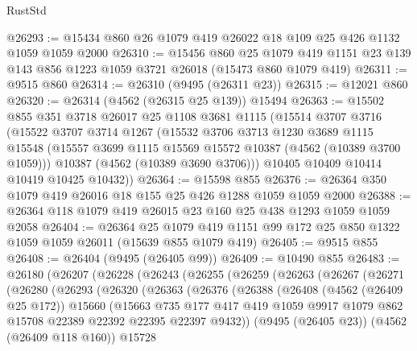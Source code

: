 \begin{lexlean}{RustStd}
\begin{coremodule}
@26293 := @15434 @860 @26 @1079 @419 @26022 @18 @109 @25 @426 @1132 @1059 @1059 @2000
@26310 := @15456
    @860
    @25
    @1079
    @419
    @1151
    @23
    @139
    @143
    @856
    @1223
    @1059
    @3721
    @26018
    (@15473 @860 @1079 @419)
@26311 := @9515 @860
@26314 := @26310 (@9495 (@26311 @23))
@26315 := @12021 @860
@26320 := @26314 (@4562 (@26315 @25 @139)) @15494
@26363 := @15502
    @855
    @351
    @3718
    @26017
    @25
    @1108
    @3681
    @1115
    (@15514
      @3707
      @3716
      (@15522
        @3707
        @3714
        @1267
        (@15532
          @3706
          @3713
          @1230
          @3689
          @1115
          @15548
          (@15557 @3699 @1115 @15569 @15572 @10387 (@4562 (@10389 @3700 @1059)))
          @10387
          (@4562 (@10389 @3690 @3706)))
        @10405
        @10409
        @10414
        @10419
        @10425
        @10432))
@26364 := @15598 @855
@26376 := @26364 @350 @1079 @419 @26016 @18 @155 @25 @426 @1288 @1059 @1059 @2000
@26388 := @26364 @118 @1079 @419 @26015 @23 @160 @25 @438 @1293 @1059 @1059 @2058
@26404 := @26364
    @25
    @1079
    @419
    @1151
    @99
    @172
    @25
    @850
    @1322
    @1059
    @1059
    @26011
    (@15639 @855 @1079 @419)
@26405 := @9515 @855
@26408 := @26404 (@9495 (@26405 @99))
@26409 := @10490 @855
@26483 := @26180
    (@26207
      (@26228
        (@26243
          (@26255
            (@26259
              (@26263
                (@26267
                  (@26271
                    (@26280
                      (@26293
                        (@26320
                          (@26363
                            (@26376
                              (@26388
                                (@26408
                                  (@4562 (@26409 @25 @172))
                                  @15660
                                  (@15663
                                    @735
                                    @177
                                    @417
                                    @419
                                    @1059
                                    @9917
                                    @1079
                                    @862
                                    @15708
                                    @22389
                                    @22392
                                    @22395
                                    @22397
                                    @9432))
                                (@9495 (@26405 @23))
                                (@4562 (@26409 @118 @160))
                                @15728

\end{coremodule}
\end{lexlean}
